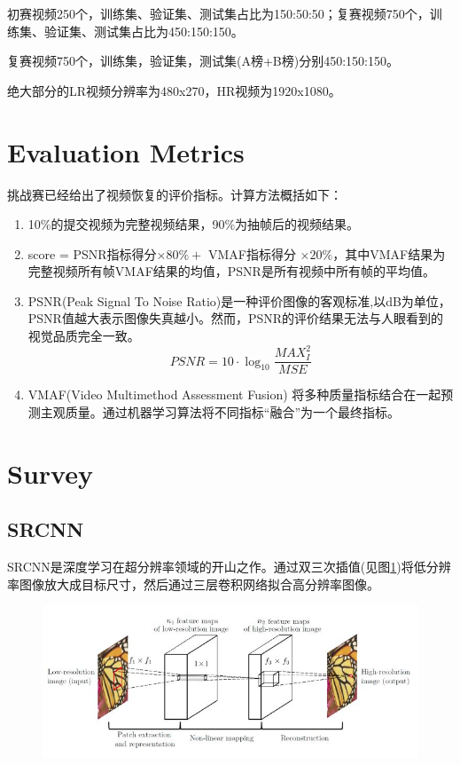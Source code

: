 \documentclass{article}
\begin{document}
初赛视频250个，训练集、验证集、测试集占比为150:50:50；复赛视频750个，训练集、验证集、测试集占比为450:150:150。

复赛视频750个，训练集，验证集，测试集(A榜+B榜)分别450:150:150。

绝大部分的LR视频分辨率为480x270，HR视频为1920x1080。

\section{Evaluation Metrics}
挑战赛已经给出了视频恢复的评价指标。计算方法概括如下：
\begin{enumerate}
	\item 10\%的提交视频为完整视频结果，90\%为抽帧后的视频结果。
	\item score = PSNR指标得分$\times 80\% + $ VMAF指标得分 $\times 20\%$，其中VMAF结果为完整视频所有帧VMAF结果的均值，PSNR是所有视频中所有帧的平均值。
	\item PSNR(Peak Signal To Noise Ratio)是一种评价图像的客观标准,以dB为单位，PSNR值越大表示图像失真越小。然而，PSNR的评价结果无法与人眼看到的视觉品质完全一致。
	\begin{equation}\label{key}
	PSNR = 10 \cdot \log_{10} \frac{MAX_{I}^{2}}{MSE} 
	\end{equation}
	\item VMAF(Video Multimethod Assessment Fusion) 将多种质量指标结合在一起预测主观质量。通过机器学习算法将不同指标“融合”为一个最终指标。
	
\end{enumerate}


\section{Survey}

\subsection{SRCNN}
SRCNN\cite{SRCNN}是深度学习在超分辨率领域的开山之作。通过双三次插值(见图\ref{fig:srcnn})将低分辨率图像放大成目标尺寸，然后通过三层卷积网络拟合高分辨率图像。
\begin{figure}
	\centering
	\includegraphics[width=0.8\linewidth]{SRCNN}
	\caption{}
	\label{fig:srcnn}
\end{figure}
\end{document}
